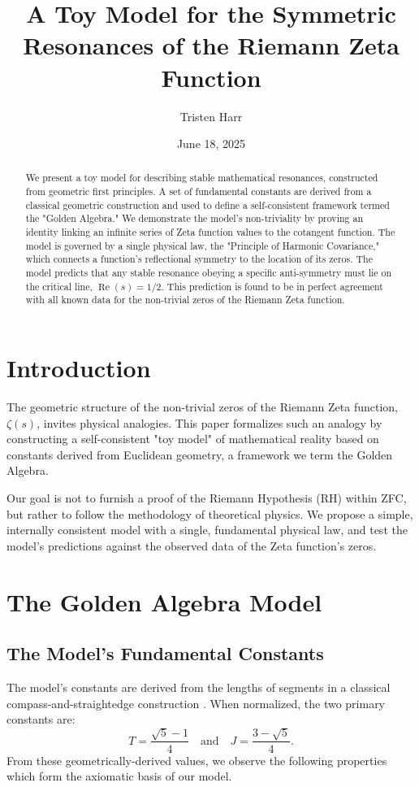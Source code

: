 \documentclass{amsart}
\title[A Toy Model for Zeta Resonances]{A Toy Model for the Symmetric Resonances of the Riemann Zeta Function}
\author{Tristen Harr}
\date{June 18, 2025}
\theoremstyle{plain}
\theoremstyle{definition}
\theoremstyle{remark}
\DeclareMathOperator{\re}{Re}
\begin{document}
\begin{abstract}
We present a toy model for describing stable mathematical resonances, constructed from geometric first principles. A set of fundamental constants are derived from a classical geometric construction and used to define a self-consistent framework termed the "Golden Algebra." We demonstrate the model's non-triviality by proving an identity linking an infinite series of Zeta function values to the cotangent function. The model is governed by a single physical law, the "Principle of Harmonic Covariance," which connects a function's reflectional symmetry to the location of its zeros. The model predicts that any stable resonance obeying a specific anti-symmetry must lie on the critical line, $\re(s)=1/2$. This prediction is found to be in perfect agreement with all known data for the non-trivial zeros of the Riemann Zeta function.
\end{abstract}

\maketitle

\section{Introduction}
The geometric structure of the non-trivial zeros of the Riemann Zeta function, $\zeta(s)$, invites physical analogies. This paper formalizes such an analogy by constructing a self-consistent "toy model" of mathematical reality based on constants derived from Euclidean geometry, a framework we term the Golden Algebra.

Our goal is not to furnish a proof of the Riemann Hypothesis (RH) within ZFC, but rather to follow the methodology of theoretical physics. We propose a simple, internally consistent model with a single, fundamental physical law, and test the model's predictions against the observed data of the Zeta function's zeros.

\section{The Golden Algebra Model}
\subsection{The Model's Fundamental Constants}
The model's constants are derived from the lengths of segments in a classical compass-and-straightedge construction \cite{HarrManuscripts}. When normalized, the two primary constants are:
\[ T = \frac{\sqrt{5}-1}{4} \quad \text{and} \quad J = \frac{3-\sqrt{5}}{4}. \]
From these geometrically-derived values, we observe the following properties which form the axiomatic basis of our model.
\end{document}
